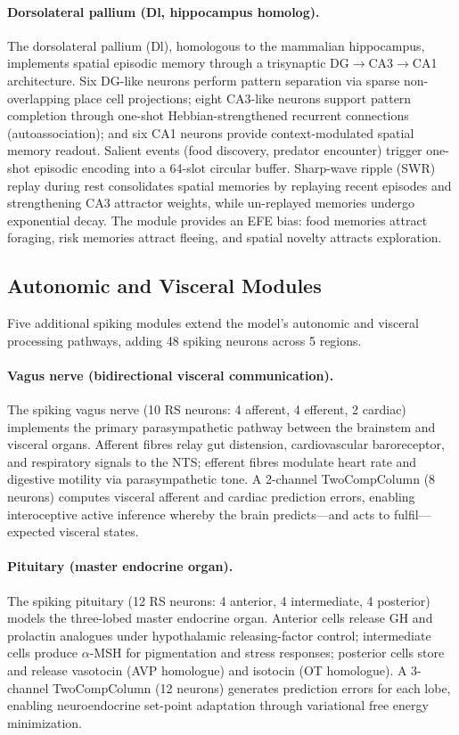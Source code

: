 \documentclass[11pt,a4paper]{article}
\begin{document}
\paragraph{Dorsolateral pallium (Dl, hippocampus homolog).}
The dorsolateral pallium (Dl), homologous to the mammalian hippocampus,
implements spatial episodic memory through a trisynaptic DG$\to$CA3$\to$CA1
architecture.
Six DG-like neurons perform pattern separation via sparse non-overlapping
place cell projections; eight CA3-like neurons support pattern completion
through one-shot Hebbian-strengthened recurrent connections
(autoassociation); and six CA1 neurons provide context-modulated spatial
memory readout.
Salient events (food discovery, predator encounter) trigger one-shot
episodic encoding into a 64-slot circular buffer.
Sharp-wave ripple (SWR) replay during rest consolidates spatial memories
by replaying recent episodes and strengthening CA3 attractor weights,
while un-replayed memories undergo exponential decay.
The module provides an EFE bias: food memories attract foraging, risk
memories attract fleeing, and spatial novelty attracts exploration.

\subsection{Autonomic and Visceral Modules}

Five additional spiking modules extend the model's autonomic and
visceral processing pathways, adding 48 spiking neurons across 5 regions.

\paragraph{Vagus nerve (bidirectional visceral communication).}
The spiking vagus nerve (10 RS neurons: 4 afferent, 4 efferent,
2 cardiac) implements the primary parasympathetic pathway between the
brainstem and visceral organs.
Afferent fibres relay gut distension, cardiovascular baroreceptor,
and respiratory signals to the NTS; efferent fibres modulate heart rate
and digestive motility via parasympathetic tone.
A 2-channel TwoCompColumn (8 neurons) computes visceral afferent and
cardiac prediction errors, enabling interoceptive active inference
whereby the brain predicts---and acts to fulfil---expected visceral states.

\paragraph{Pituitary (master endocrine organ).}
The spiking pituitary (12 RS neurons: 4 anterior, 4 intermediate,
4 posterior) models the three-lobed master endocrine organ.
Anterior cells release GH and prolactin analogues under hypothalamic
releasing-factor control; intermediate cells produce $\alpha$-MSH for
pigmentation and stress responses; posterior cells store and release
vasotocin (AVP homologue) and isotocin (OT homologue).
A 3-channel TwoCompColumn (12 neurons) generates prediction errors
for each lobe, enabling neuroendocrine set-point adaptation through
variational free energy minimization.
\end{document}
